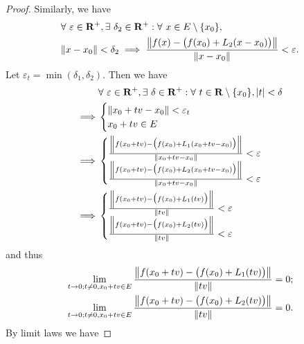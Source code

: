 \begin{proof}
    Similarly, we have
    \begin{align*}
         & \forall\ \varepsilon \in \mathbf{R}^+, \exists\ \delta_2 \in \mathbf{R}^+ : \forall\ x \in E \setminus \{x_0\},           \\
         & \norm*{x - x_0} < \delta_2 \implies \frac{\norm*{f(x) - \big(f(x_0) + L_2(x - x_0)\big)}}{\norm*{x - x_0}} < \varepsilon.
    \end{align*}
    Let \(\varepsilon_t = \min(\delta_1, \delta_2)\).
    Then we have
    \begin{align*}
                 & \forall\ \varepsilon \in \mathbf{R}^+, \exists\ \delta \in \mathbf{R}^+ : \forall\ t \in \mathbf{R} \setminus \{x_0\}, \abs*{t} < \delta \\
        \implies & \begin{cases}
            \norm*{x_0 + tv - x_0} < \varepsilon_t \\
            x_0 + tv \in E
        \end{cases}                                                                                                               \\
        \implies & \begin{cases}
            \frac{\norm*{f(x_0 + tv) - \big(f(x_0) + L_1(x_0 + tv - x_0)\big)}}{\norm*{x_0 + tv - x_0}} < \varepsilon \\
            \frac{\norm*{f(x_0 + tv) - \big(f(x_0) + L_2(x_0 + tv - x_0)\big)}}{\norm*{x_0 + tv - x_0}} < \varepsilon
        \end{cases}                                                                                                               \\
        \implies & \begin{cases}
            \frac{\norm*{f(x_0 + tv) - \big(f(x_0) + L_1(tv)\big)}}{\norm*{tv}} < \varepsilon \\
            \frac{\norm*{f(x_0 + tv) - \big(f(x_0) + L_2(tv)\big)}}{\norm*{tv}} < \varepsilon
        \end{cases}
    \end{align*}
    and thus
    \begin{align*}
         & \lim_{t \to 0 ; t \neq 0, x_0 + tv \in E} \frac{\norm*{f(x_0 + tv) - \big(f(x_0) + L_1(tv)\big)}}{\norm*{tv}} = 0; \\
         & \lim_{t \to 0 ; t \neq 0, x_0 + tv \in E} \frac{\norm*{f(x_0 + tv) - \big(f(x_0) + L_2(tv)\big)}}{\norm*{tv}} = 0.
    \end{align*}
    By limit laws we have

\end{proof}
